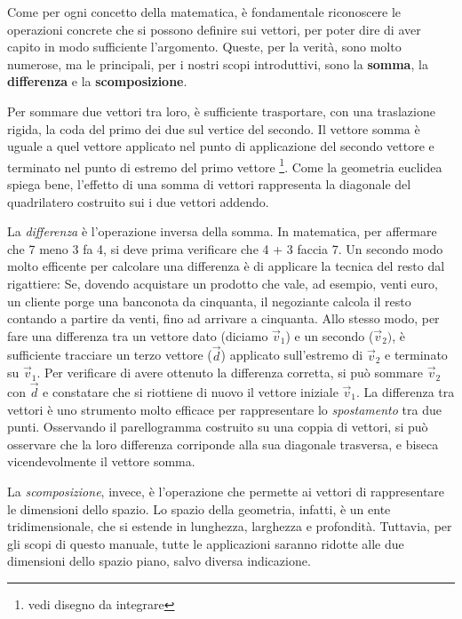 Come per ogni concetto della matematica, è fondamentale riconoscere le operazioni concrete che si possono definire sui vettori, per poter dire di aver capito in modo sufficiente l'argomento.\newline
Queste, per la verità, sono molto numerose, ma le principali, per i nostri scopi introduttivi, sono la {\bfseries somma}, la {\bfseries differenza} e la {\bfseries scomposizione}.\newline

Per sommare due vettori tra loro, è sufficiente trasportare, con una traslazione rigida, la coda del primo dei due sul vertice del secondo. Il vettore somma è uguale a quel vettore applicato nel punto di applicazione del secondo vettore e terminato nel punto di estremo del primo vettore \footnote {vedi disegno da integrare}. Come la geometria euclidea spiega bene, l'effetto di una somma di vettori rappresenta la diagonale del quadrilatero costruito sui i due vettori addendo.\newline
\newline

La {\slshape differenza} è l'operazione inversa della somma. In matematica, per affermare che 7 meno 3 fa 4, si deve prima verificare che 4 + 3 faccia 7. Un secondo modo molto efficente per calcolare una differenza è di applicare la tecnica del resto dal rigattiere:\newline
Se, dovendo acquistare un prodotto che vale, ad esempio, venti euro, un cliente porge una banconota da cinquanta, il negoziante calcola il resto contando a partire da venti, fino ad arrivare a cinquanta.
Allo stesso modo, per fare una differenza tra un vettore  dato (diciamo $\vec v_1$) e un secondo ($\vec v_2)$, è sufficiente tracciare un terzo vettore ($\vec {d}$) applicato sull'estremo di $\vec v_2$ e terminato su $\vec v_1$.\newline
Per verificare di avere ottenuto la differenza corretta, si può sommare $\vec v_2$ con $\vec {d}$ e constatare che si riottiene di nuovo il vettore iniziale $\vec v_1$.\newline
La differenza tra vettori è uno strumento molto efficace per rappresentare lo {\slshape spostamento} tra due punti.\newline
Osservando il parellogramma costruito su una coppia di vettori, si può osservare che la loro differenza corriponde alla sua diagonale trasversa, e biseca vicendevolmente il vettore somma.
\newline

La {\slshape scomposizione}, invece, è l'operazione che permette ai vettori di rappresentare le dimensioni dello spazio.\newline
Lo spazio della geometria, infatti, è un ente tridimensionale, che si estende in lunghezza, larghezza e profondità.\newline
Tuttavia, per gli scopi di questo manuale, tutte le applicazioni saranno ridotte alle due dimensioni dello spazio piano, salvo diversa indicazione.
\newline

